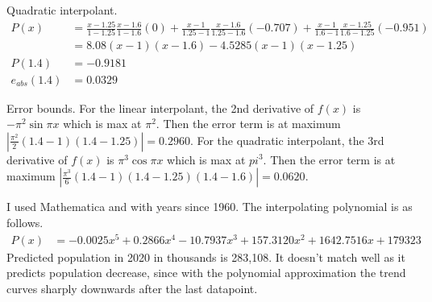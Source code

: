 \documentclass{homework}
\begin{document}
Quadratic interpolant.
\begin{align*}
	P(x)	&=	\frac{x-1.25}{1-1.25} \frac{x-1.6}{1-1.6} (0) + 
	\frac{x-1}{1.25-1} \frac{x-1.6}{1.25-1.6} (-0.707) + 
	\frac{x-1}{1.6-1} \frac{x-1.25}{1.6-1.25} (-0.951)	\\
	&=	\boxed{8.08(x-1)(x-1.6) - 4.5285(x-1)(x-1.25)} \\
	P(1.4)	&=	-0.9181	\\
	e_{abs}(1.4)	&=	0.0329
\end{align*}

Error bounds. For the linear interpolant, the 2nd derivative of $f(x)$ is $-\pi^2 \sin \pi x$ which is max at $\pi^2$. Then the error term is at maximum $|\frac{\pi^2}{2}(1.4-1)(1.4-1.25)| = 0.2960$. For the quadratic interpolant, the 3rd derivative of $f(x)$ is $\pi^3 \cos \pi x$ which is max at $pi^3$. Then the error term is at maximum $|\frac{\pi^3}{6}(1.4-1)(1.4-1.25)(1.4-1.6)| = 0.0620$.

\question
I used Mathematica and with years since 1960. The interpolating polynomial is as follows. 
\begin{align*}
	P(x)	&=	\boxed{-0.0025x^5 + 0.2866x^4 - 10.7937x^3 + 157.3120x^2 + 1642.7516x + 179323}
\end{align*}
Predicted population in 2020 in thousands is 283,108. It doesn't match well as it predicts population decrease, since with the polynomial approximation the trend curves sharply downwards after the last datapoint.
\end{document}

